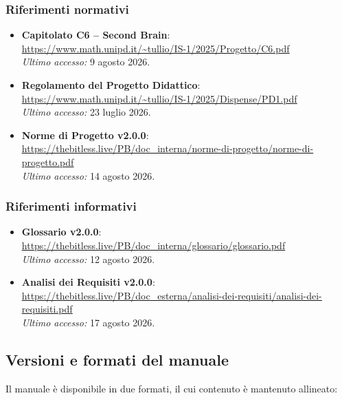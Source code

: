 \documentclass[a4paper, 10pt]{article}
\newcommand{\linklungo}[1]{{\footnotesize\uline{\url{#1}}}}
\begin{document}
\subsubsection{Riferimenti normativi}
\label{sec:riferimenti-normativi}
\begin{itemize}
    \item \textbf{Capitolato C6 -- Second Brain}: \\
    \linklungo{https://www.math.unipd.it/~tullio/IS-1/2025/Progetto/C6.pdf} \\
    \textit{Ultimo accesso:} 9 agosto 2026.

    \item \textbf{Regolamento del Progetto Didattico}: \\
    \linklungo{https://www.math.unipd.it/~tullio/IS-1/2025/Dispense/PD1.pdf} \\
    \textit{Ultimo accesso:} 23 luglio 2026.

    \item \textbf{Norme di Progetto v2.0.0}: \\
    \linklungo{https://thebitless.live/PB/doc_interna/norme-di-progetto/norme-di-progetto.pdf} \\
    \textit{Ultimo accesso:} 14 agosto 2026.
\end{itemize}

\subsubsection{Riferimenti informativi}
\label{sec:riferimenti-informativi}
\begin{itemize}
    \item \textbf{Glossario v2.0.0}: \\
    \linklungo{https://thebitless.live/PB/doc_interna/glossario/glossario.pdf} \\
    \textit{Ultimo accesso:} 12 agosto 2026.

    \item \textbf{Analisi dei Requisiti v2.0.0}: \\
    \linklungo{https://thebitless.live/PB/doc_esterna/analisi-dei-requisiti/analisi-dei-requisiti.pdf} \\
    \textit{Ultimo accesso:} 17 agosto 2026.
\end{itemize}

\subsection{Versioni e formati del manuale}
\label{sec:versioni-formati}
Il manuale è disponibile in due formati, il cui contenuto è mantenuto allineato:
\end{document}
